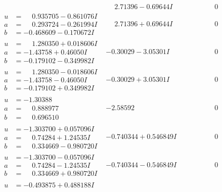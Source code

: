 \documentclass[1p]{elsarticle_modified}
\theoremstyle{definition}
\begin{document}
$$\begin{array}{c|c|c}
 & \phantom{-}2.71396 - 0.69644 I & \phantom{-0.000000 } 0 \\ \hline\begin{aligned}
u &= \phantom{-}0.935705 - 0.861076 I \\
a &= \phantom{-}0.293724 - 0.261994 I \\
b &= -0.468609 - 0.170672 I\end{aligned}
 & \phantom{-}2.71396 + 0.69644 I & \phantom{-0.000000 } 0 \\ \hline\begin{aligned}
u &= \phantom{-}1.280350 + 0.018606 I \\
a &= -1.43758 + 0.46050 I \\
b &= -0.179102 - 0.349982 I\end{aligned}
 & -0.30029 - 3.05301 I & \phantom{-0.000000 } 0 \\ \hline\begin{aligned}
u &= \phantom{-}1.280350 - 0.018606 I \\
a &= -1.43758 - 0.46050 I \\
b &= -0.179102 + 0.349982 I\end{aligned}
 & -0.30029 + 3.05301 I & \phantom{-0.000000 } 0 \\ \hline\begin{aligned}
u &= -1.30388\phantom{ +0.000000I} \\
a &= \phantom{-}0.888977\phantom{ +0.000000I} \\
b &= \phantom{-}0.696510\phantom{ +0.000000I}\end{aligned}
 & -2.58592\phantom{ +0.000000I} & \phantom{-0.000000 } 0 \\ \hline\begin{aligned}
u &= -1.303700 + 0.057096 I \\
a &= \phantom{-}0.74284 + 1.24535 I \\
b &= \phantom{-}0.334669 - 0.980720 I\end{aligned}
 & -0.740344 + 0.546849 I & \phantom{-0.000000 } 0 \\ \hline\begin{aligned}
u &= -1.303700 - 0.057096 I \\
a &= \phantom{-}0.74284 - 1.24535 I \\
b &= \phantom{-}0.334669 + 0.980720 I\end{aligned}
 & -0.740344 - 0.546849 I & \phantom{-0.000000 } 0 \\ \hline\begin{aligned}
u &= -0.493875 + 0.488188 I \\

\end{aligned}
\end{array}$$
\end{document}
